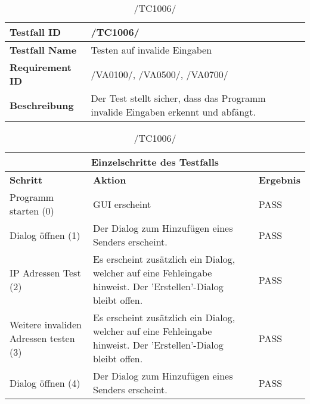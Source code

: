 \begin{table}[h]
\caption{/TC1006/}
\label{tab:TC1006}
\begin{center}
\begin{tabular}{|p{3.5cm}|p{11cm}|}
\hline
\textbf{Testfall ID} & /TC1006/\\
\hline
\textbf{Testfall Name} & Testen auf invalide Eingaben
\\
\hline
\textbf{Requirement ID} & /VA0100/, /VA0500/, /VA0700/\\
\hline
\textbf{Beschreibung} & Der Test stellt sicher, dass das Programm invalide
Eingaben erkennt und abfängt.\\
\hline
\end{tabular}
\begin{tabular}{|p{4cm}|p{7.8cm}|p{2.3cm}|}
\multicolumn{3}{|c|}{\textbf{Einzelschritte des Testfalls}} \\
\hline
\textbf{Schritt} & \textbf{Aktion} & \textbf{Ergebnis}\\
\hline
Programm starten (0) & GUI erscheint & PASS
\\
\hline
Dialog öffnen (1) & Der Dialog
 zum Hinzufügen eines Senders erscheint. & PASS
\\
\hline
IP Adressen Test (2) & Es erscheint zusätzlich ein Dialog, welcher auf eine Fehleingabe hinweist.
 Der 'Erstellen'-Dialog bleibt offen. & PASS
\\
\hline
Weitere invaliden Adressen testen (3) & Es erscheint zusätzlich ein Dialog, welcher auf eine Fehleingabe hinweist.
 Der 'Erstellen'-Dialog bleibt offen. & PASS
\\
\hline
Dialog öffnen (4) & Der Dialog
 zum Hinzufügen eines Senders erscheint. & PASS
\\
\hline
\end{tabular}
\end{center}
\end{table}

